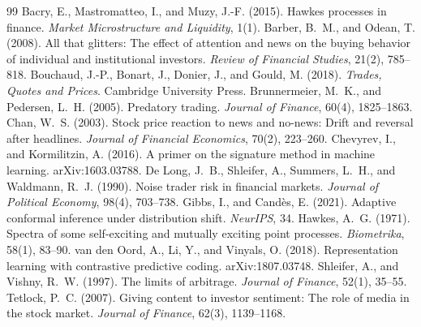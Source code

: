 \documentclass[11pt,a4paper]{article}
\begin{document}
\begin{thebibliography}{99}\small
{} Bacry, E., Mastromatteo, I., and Muzy, J.-F. (2015). Hawkes processes in finance. \emph{Market Microstructure and Liquidity}, 1(1).
 Barber, B.~M., and Odean, T. (2008). All that glitters: The effect of attention and news on the buying behavior of individual and institutional investors. \emph{Review of Financial Studies}, 21(2), 785--818.
 Bouchaud, J.-P., Bonart, J., Donier, J., and Gould, M. (2018). \emph{Trades, Quotes and Prices}. Cambridge University Press.
 Brunnermeier, M.~K., and Pedersen, L.~H. (2005). Predatory trading. \emph{Journal of Finance}, 60(4), 1825--1863.
 Chan, W.~S. (2003). Stock price reaction to news and no-news: Drift and reversal after headlines. \emph{Journal of Financial Economics}, 70(2), 223--260.
 Chevyrev, I., and Kormilitzin, A. (2016). A primer on the signature method in machine learning. arXiv:1603.03788.
 De Long, J.~B., Shleifer, A., Summers, L.~H., and Waldmann, R.~J. (1990). Noise trader risk in financial markets. \emph{Journal of Political Economy}, 98(4), 703--738.
 Gibbs, I., and Cand\`es, E. (2021). Adaptive conformal inference under distribution shift. \emph{NeurIPS}, 34.
 Hawkes, A.~G. (1971). Spectra of some self-exciting and mutually exciting point processes. \emph{Biometrika}, 58(1), 83--90.
 van den Oord, A., Li, Y., and Vinyals, O. (2018). Representation learning with contrastive predictive coding. arXiv:1807.03748.
 Shleifer, A., and Vishny, R.~W. (1997). The limits of arbitrage. \emph{Journal of Finance}, 52(1), 35--55.
 Tetlock, P.~C. (2007). Giving content to investor sentiment: The role of media in the stock market. \emph{Journal of Finance}, 62(3), 1139--1168.
\end{thebibliography}
\end{document}
